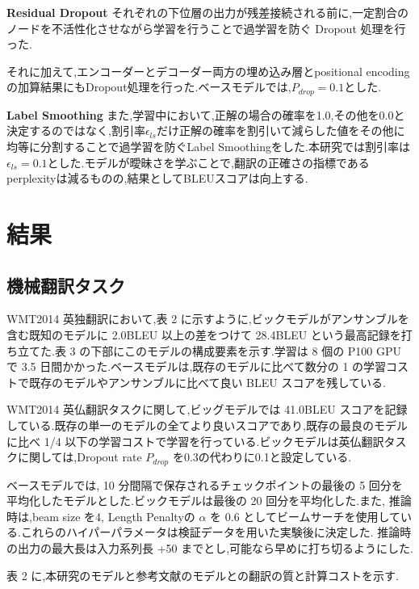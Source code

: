 \documentclass{jarticle}     %
\begin{document}
\textbf{Residual Dropout}
それぞれの下位層の出力が残差接続される前に,一定割合のノードを不活性化させながら学習を行うことで過学習を防ぐ Dropout 処理\cite{Dropout,27}を行った.\par
それに加えて,エンコーダーとデコーダー両方の埋め込み層とpositional encodingの加算結果にもDropout処理を行った.ベースモデルでは,$P_{drop} = 0.1$とした.

\textbf{Label Smoothing}
また,学習中において,正解の場合の確率を1.0,その他を0.0と決定するのではなく,割引率$\epsilon_{ls}$だけ正解の確率を割引いて減らした値をその他に均等に分割することで過学習を防ぐLabel Smoothing\cite{LabelSmoothing}をした.本研究では割引率は$\epsilon_{ls} = 0.1$とした\cite{30}.モデルが曖昧さを学ぶことで,翻訳の正確さの指標であるperplexityは減るものの,結果としてBLEUスコアは向上する.

\section{結果}


\subsection{機械翻訳タスク}
WMT2014 英独翻訳において,表 2 に示すように,ビックモデルがアンサンブルを含む既知のモデルに 2.0BLEU 以上の差をつけて 28.4BLEU という最高記録を打ち立てた.表 3 の下部にこのモデルの構成要素を示す.学習は 8 個の P100 GPU で 3.5 日間かかった.ベースモデルは,既存のモデルに比べて数分の 1 の学習コストで既存のモデルやアンサンブルに比べて良い BLEU スコアを残している.
\par
 WMT2014 英仏翻訳タスクに関して,ビッグモデルでは 41.0BLEU スコアを記録している.既存の単一のモデルの全てより良いスコアであり,既存の最良のモデルに比べ 1/4 以下の学習コストで学習を行っている.ビックモデルは英仏翻訳タスクに関しては,Dropout rate $P_{drop}$ を0.3の代わりに0.1と設定している.
\par

ベースモデルでは, 10 分間隔で保存されるチェックポイントの最後の 5 回分を平均化したモデルとした.ビックモデルは最後の 20 回分を平均化した.また, 推論時は,beam size を4, Length Penaltyの $\alpha$ を 0.6 としてビームサーチを使用している\cite{31}.これらのハイパーパラメータは検証データを用いた実験後に決定した.
推論時の出力の最大長は入力系列長 +50 までとし,可能なら早めに打ち切るようにした\cite{31}.
\par
表 2 に,本研究のモデルと参考文献のモデルとの翻訳の質と計算コストを示す.
\end{document}
